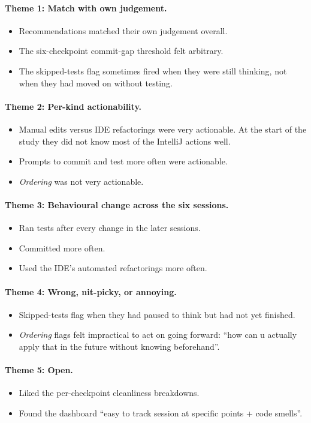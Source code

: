 \paragraph{Theme 1: Match with own judgement.}
\begin{itemize}
  \item Recommendations matched their own judgement overall.
  \item The six-checkpoint commit-gap threshold felt arbitrary.
  \item The skipped-tests flag sometimes fired when they were still thinking, not when they had moved on without testing.
\end{itemize}

\paragraph{Theme 2: Per-kind actionability.}
\begin{itemize}
  \item Manual edits versus IDE refactorings were very actionable. At the start of the study they did not know most of the IntelliJ actions well.
  \item Prompts to commit and test more often were actionable.
  \item \emph{Ordering} was not very actionable.
\end{itemize}

\paragraph{Theme 3: Behavioural change across the six sessions.}
\begin{itemize}
  \item Ran tests after every change in the later sessions.
  \item Committed more often.
  \item Used the IDE's automated refactorings more often.
\end{itemize}

\paragraph{Theme 4: Wrong, nit-picky, or annoying.}
\begin{itemize}
  \item Skipped-tests flag when they had paused to think but had not yet finished.
  \item \emph{Ordering} flags felt impractical to act on going forward: ``how can u actually apply that in the future without knowing beforehand''.
\end{itemize}

\paragraph{Theme 5: Open.}
\begin{itemize}
  \item Liked the per-checkpoint cleanliness breakdowns.
  \item Found the dashboard ``easy to track session at specific points + code smells''.
\end{itemize}
